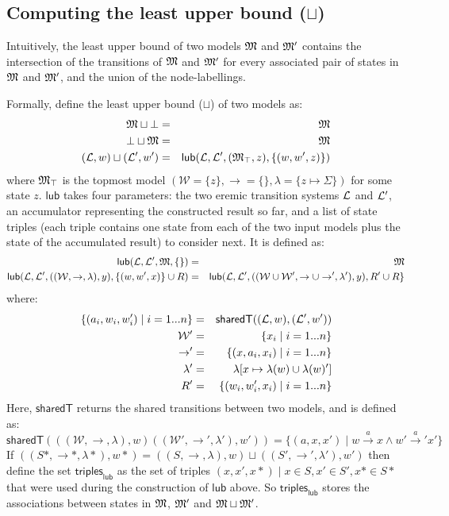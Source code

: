\subsection{Computing the least upper bound ($\sqcup$)}
Intuitively, the least upper bound of two models $\frak{M}$ and $\frak{M}'$ contains the intersection of the transitions of $\frak{M}$ and $\frak{M}'$ for every associated pair of states in $\frak{M}$ and $\frak{M}'$, and the union of the node-labellings.

Formally, define the least upper bound ($\sqcup$) of two models as:
\begin{eqnarray*}
\frak{M} \sqcup \bot & = & \frak{M} \\
\bot \sqcup \frak{M} & = & \frak{M} \\
(\mathcal{L},w) \sqcup (\mathcal{L}',w') & = & \mathsf{lub}(\mathcal{L}, \mathcal{L}', (\frak{M}_\top, z), \{(w, w', z)\})
\end{eqnarray*}
where $\frak{M}_\top$ is the topmost model $(\mathcal{W}=\{z\}, \rightarrow=\{\}, \lambda=\{z \mapsto \Sigma\})$ for some state $z$.
$\mathsf{lub}$ takes four parameters: the two eremic transition systems $\mathcal{L}$ and $\mathcal{L}'$, an accumulator representing the constructed result so far, and a list of state triples (each triple contains one state from each of the two input models plus the state of the accumulated result) to consider next.
It is defined as:
\begin{eqnarray*}
\mathsf{lub}(\mathcal{L}, \mathcal{L}', \frak{M}, \{\}) & = & \frak{M} \\
\mathsf{lub}(\mathcal{L}, \mathcal{L}', ((\mathcal{W}, \rightarrow, \lambda), y), \{(w,w',x)\} \cup R) & = & \mathsf{lub}(\mathcal{L}, \mathcal{L}', ((\mathcal{W} \cup \mathcal{W}', \rightarrow \cup \rightarrow', \lambda'), y), R' \cup R\}
\end{eqnarray*}
where:
\begin{eqnarray*}
\{(a_i, w_i, w'_i) \;|\; i = 1 ... n\} & = & \mathsf{sharedT}((\mathcal{L},w), (\mathcal{L}',w')) \\
\mathcal{W}' & = & \{x_i \;|\; i = 1 ... n\} \\
\rightarrow' & = & \{(x, a_i, x_i) \;|\; i = 1 ... n\} \\
\lambda' & = & \lambda [x \mapsto \lambda(w) \cup \lambda(w)'] \\
R' & = & \{(w_i, w'_i, x_i) \;|\; i = 1 ... n\}
\end{eqnarray*}
Here, $\mathsf{sharedT}$ returns the shared transitions between two models, and is defined as:
\[
\mathsf{sharedT}(((\mathcal{W}, \rightarrow, \lambda),w) ((\mathcal{W}', \rightarrow', \lambda'),w')) =  \{(a, x, x') \;|\; w \xrightarrow{a} x \land w' \xrightarrow{a}' x'\}
\]
If $((S*,\rightarrow*,\lambda*),w*) = ((S,\rightarrow,\lambda),w) \sqcup ((S',\rightarrow',\lambda'),w')$ then define
the set $\mathsf{triples}_\mathsf{lub}$ as the set of triples $(x,x',x*) \; | \; x \in S, x' \in S', x* \in S*$ that were used during the construction of $\mathsf{lub}$ above. So $\mathsf{triples}_\mathsf{lub}$ stores the associations between states in $\frak{M}$, $\frak{M}'$ and $\frak{M} \sqcup \frak{M}'$. 

